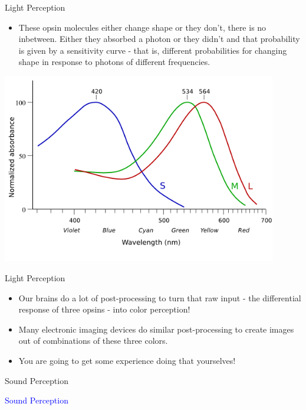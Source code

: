 \documentclass{beamer}
\begin{document}
\begin{frame}{Light Perception}
   \begin{itemize}
      \item These opsin molecules either change shape or they don't, there is no inbetween. Either they absorbed a photon or they didn't and that probability is given by a sensitivity curve - that is, different probabilities for changing shape in response to photons of different frequencies.
   \end{itemize}
   \begin{center}
      \includegraphics[width=0.9\textwidth]{figures/conecurves.png}
   \end{center}
\end{frame}

\begin{frame}{Light Perception}
   \begin{itemize}
      \item Our brains do a lot of post-processing to turn that raw input - the differential response of three opsins - into color perception!
      \item Many electronic imaging devices do similar post-processing to create images out of combinations of these three colors.
      \item You are going to get some experience doing that yourselves!
   \end{itemize}
\end{frame}

\begin{frame}{Sound Perception}
   \begin{center}
      \Huge \textcolor{blue}{Sound Perception}
   \end{center}
\end{frame}
\end{document}
